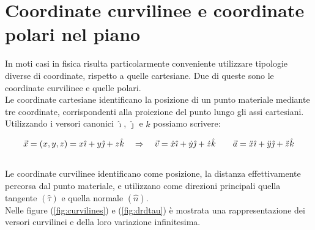 \section{Coordinate curvilinee e coordinate polari nel piano}
In moti casi in fisica risulta particolarmente conveniente utilizzare 
tipologie diverse di coordinate, rispetto a quelle cartesiane. Due di queste sono le coordinate curvilinee e quelle polari.\\
Le coordinate cartesiane identificano la posizione di un punto materiale 
mediante tre coordinate, corrispondenti alla proiezione del punto lungo gli assi cartesiani. Utilizzando i versori canonici $\hat\imath$, $\hat\jmath$ e $\hat k$ possiamo scrivere:

\begin{equation}
    \vec x = \left( x, y, z\right) = x\hat\imath + y\hat\jmath + z\hat k\quad\Rightarrow\quad
    \vec v = \dot x\hat\imath +\dot y\hat\jmath +\dot z\hat k\quad\quad
    \vec a = \ddot x\hat\imath +\ddot y\hat\jmath +\ddot z\hat k
\label{eq:Cartesian}
\end{equation}
\\
Le coordinate curvilinee identificano come posizione, la distanza
effettivamente percorsa dal punto materiale, e utilizzano come direzioni
principali quella tangente $(\hat\tau)$ e quella normale $(\hat n)$.\\
Nelle figure (\ref{fig:curvilines}) e (\ref{fig:drdtau}) è mostrata una
rappresentazione dei versori curvilinei e della loro variazione infinitesima.


